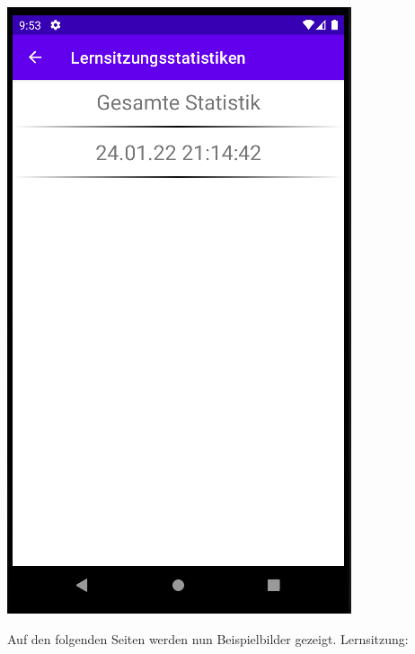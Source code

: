 \documentclass{article}
\begin{document}
\begin{center}
    \includegraphics[scale=0.45]{stats_selectionLearn.png}
\end{center}
Auf den folgenden Seiten werden nun Beispielbilder gezeigt.
\newpage
\centering Lernsitzung:
\end{document}
